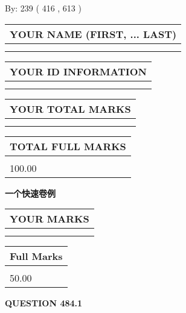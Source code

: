 \documentclass{ctexart}
\begin{document}
   
\hspace{1.0in} By: 
 239 ( 416 ,  613 )
   
   
   
   
\newpage 
\setcounter{page}{ 
   484001 } 
   
   
   
   
\noindent\begin{tabular}{|l|}
\hline
YOUR NAME (FIRST, ... LAST)  \\
\hline
 \\ 
 \\ 
\hline
\end{tabular}
\hspace{0.05in} \begin{tabular}{|l|}
\hline
 YOUR   ID   INFORMATION  \\
\hline
 \\ 
 \\ 
\hline
\end{tabular}
   
   
\vspace{0.2in}\noindent\begin{tabular}{|l|}
\hline
YOUR TOTAL MARKS  \\
\hline
 \\ 
 \\ 
\hline
\end{tabular}
\hspace{0.05in} \begin{tabular}{|l|}
\hline
TOTAL FULL MARKS  \\
\hline
 \\ 
100.00 \\
\hline
\end{tabular}
   
   
 \vspace{0.2in}
{\LARGE {\textbf{ 一个快速卷例}}}
   
   
  
\vspace{0.2in}
  
\noindent\begin{tabular}{|l|}
\hline
 YOUR MARKS  \\
\hline
 \\ 
 \\ 
\hline
\end{tabular}
\hspace{0.05in} \begin{tabular}{|l|}
\hline
 Full Marks  \\
\hline
 \\ 
50.00 \\
\hline
\end{tabular}
{\textbf{\Large{QUESTION
484.1 
}}}
  
\end{document}
